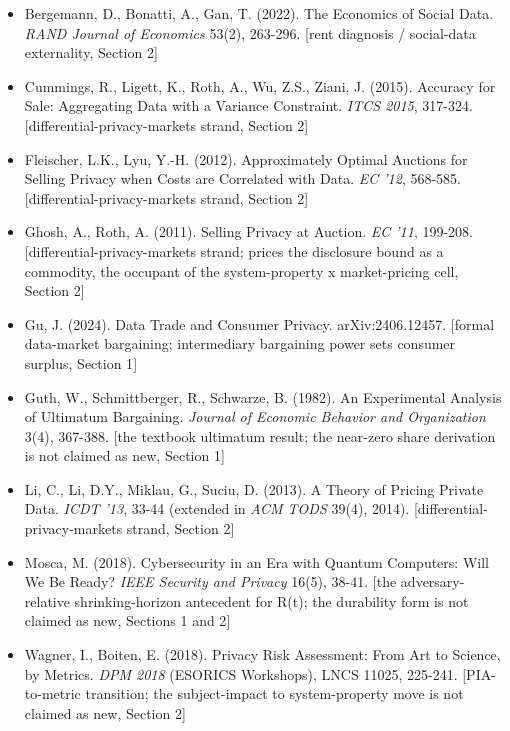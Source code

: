\documentclass[
  11pt,
]{article}
\providecommand{\tightlist}{%
  \setlength{\itemsep}{0pt}\setlength{\parskip}{0pt}}
\begin{document}
\begin{itemize}
\tightlist
\item
  Bergemann, D., Bonatti, A., Gan, T. (2022). The Economics of Social
  Data. \emph{RAND Journal of Economics} 53(2), 263-296. {[}rent
  diagnosis / social-data externality, Section 2{]}
\item
  Cummings, R., Ligett, K., Roth, A., Wu, Z.S., Ziani, J. (2015).
  Accuracy for Sale: Aggregating Data with a Variance Constraint.
  \emph{ITCS 2015}, 317-324. {[}differential-privacy-markets strand,
  Section 2{]}
\item
  Fleischer, L.K., Lyu, Y.-H. (2012). Approximately Optimal Auctions for
  Selling Privacy when Costs are Correlated with Data. \emph{EC '12},
  568-585. {[}differential-privacy-markets strand, Section 2{]}
\item
  Ghosh, A., Roth, A. (2011). Selling Privacy at Auction. \emph{EC '11},
  199-208. {[}differential-privacy-markets strand; prices the disclosure
  bound as a commodity, the occupant of the system-property x
  market-pricing cell, Section 2{]}
\item
  Gu, J. (2024). Data Trade and Consumer Privacy. arXiv:2406.12457.
  {[}formal data-market bargaining; intermediary bargaining power sets
  consumer surplus, Section 1{]}
\item
  Guth, W., Schmittberger, R., Schwarze, B. (1982). An Experimental
  Analysis of Ultimatum Bargaining. \emph{Journal of Economic Behavior
  and Organization} 3(4), 367-388. {[}the textbook ultimatum result; the
  near-zero share derivation is not claimed as new, Section 1{]}
\item
  Li, C., Li, D.Y., Miklau, G., Suciu, D. (2013). A Theory of Pricing
  Private Data. \emph{ICDT '13}, 33-44 (extended in \emph{ACM TODS}
  39(4), 2014). {[}differential-privacy-markets strand, Section 2{]}
\item
  Mosca, M. (2018). Cybersecurity in an Era with Quantum Computers: Will
  We Be Ready? \emph{IEEE Security and Privacy} 16(5), 38-41. {[}the
  adversary-relative shrinking-horizon antecedent for R(t); the
  durability form is not claimed as new, Sections 1 and 2{]}
\item
  Wagner, I., Boiten, E. (2018). Privacy Risk Assessment: From Art to
  Science, by Metrics. \emph{DPM 2018} (ESORICS Workshops), LNCS 11025,
  225-241. {[}PIA-to-metric transition; the subject-impact to
  system-property move is not claimed as new, Section 2{]}
\end{itemize}
\end{document}
